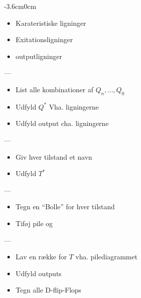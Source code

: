 \begin{changemargin}{-3.6cm}{0cm}
	
\parbox{.4in}{
}
\parbox{3in}{
    \begin{itemize}
	\item Karateristiske ligninger
	\item Exitationsligninger
	\item outputligninger
    \end{itemize}
    ---
    \begin{itemize}
	\item List alle kombinationer af $Q_n,\ldots,Q_0$
	\item Udfyld $Q^*$ Vha. ligningerne
	\item Udfyld output cha. ligningerne
    \end{itemize}
    ---
    \begin{itemize}
	\item Giv hver tilstand et navn
	\item Udfyld $T^*$
    \end{itemize}
    ---
    \begin{itemize}
	\item Tegn en ``Bolle'' for hver tilstand
	\item Tiføj pile og 
    \end{itemize}
    ---
    \begin{itemize}
	\item Lav en række for $T$ vha. pilediagrammet
	\item Udfyld outputs
    \end{itemize}
}
\parbox{1.2in}{
}
\parbox{3in}{
    \begin{itemize}
	\item Tegn alle D-flip-Flops

\end{itemize}}
\end{changemargin}
